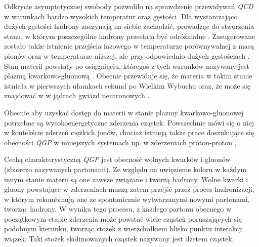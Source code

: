 Odkrycie asymptotycznej swobody pozwoliło na sprawdzenie przewidywań \textit{QCD} w warunkach bardzo wysokich temperatur oraz gęstości. 
Dla wystarczająco dużych gęstości hadrony zaczynają na siebie zachodzić, prowadząc do stworzenia stanu, w którym poszczególne hadrony przestają być odróżnialne \cite{Collins:1974ky}. 
Zasugerowane zostało także istnienie przejścia fazowego w temperaturze porównywalnej z masą pionów oraz w temperaturze niższej, ale przy odpowiednio dużych gęstościach \cite{Cabibbo:1975ig}. Stan materii powstały po osiągnięciu, któregoś z tych warunków nazywany jest plazmą kwarkowo-gluonową .
Obecnie przewiduje się, że materia w takim stanie istniała w pierwszych ułamkach sekund po Wielkim Wybuchu \cite{Boyanovsky:2006bf} oraz, że może się znajdować w w jądrach gwiazd neutronowych \cite{Alford:2013pma}.

Obecnie aby uzyskać dostęp do materii w stanie plazmy kwarkowo-gluonowej potrzebne są wysokoenergetyczne zderzenia cząstek. Powszechnie mówi się o niej w kontekście zderzeń ciężkich jonów, chociaż istnieją także prace doszukujące się obecności \textit{QGP} w mniejszych systemach np. w zderzeniach proton-proton \cite{Khachatryan:2016txc}, \cite{ALICE:2017jyt}. 

Cechą charakterystyczną \textit{QGP} jest obecność wolnych kwarków i gluonów (zbiorczo nazywanych partonami). Ze względu na uwięzienie koloru w każdym innym stanie materii są one zawsze związane i tworzą hadrony. 
Wolne kwarki i gluony powstające w zderzeniach muszą zatem przejść przez proces hadronizacji, w którym  rekombinują one ze spontanicznie wytwarzanymi nowymi partonami, tworząc hadrony. W wyniku tego procesu, z każdego partonu obecnego w początkowym etapie zderzenia może powstać wiele cząstek poruszających się podobnym kierunku, tworząc stożek z wierzchołkiem blisko punktu interakcji wiązek. Taki stożek skolimowanych cząstek nazywany jest dżetem cząstek.




